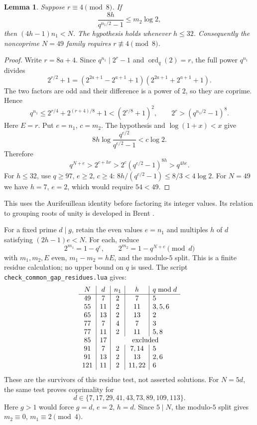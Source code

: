 \documentclass[11pt]{article}
\newtheorem{lemma}{Lemma}
\begin{document}
\begin{lemma}\label{lem:aurifeuillean-height}
Suppose $r\equiv4\pmod8$. If
\[
\frac{8h}{q^{n_1/2}-1}\le m_2\log2,
\]
then $(4h-1)n_1<N$. The hypothesis holds whenever $h\le32$.
Consequently the noncoprime $N=49$ family requires
$r\not\equiv4\pmod8$.
\end{lemma}
\begin{proof}
Write $r=8a+4$. Since $q^{n_1}\mid2^r-1$ and
$\operatorname{ord}_q(2)=r$, the full power $q^{n_1}$ divides
\[
2^{r/2}+1
=(2^{2a+1}-2^{a+1}+1)(2^{2a+1}+2^{a+1}+1).
\]
The two factors are odd and their difference is a power of $2$,
so they are coprime. Hence
\[
q^{n_1}\le2^{r/4}+2^{(r+4)/8}+1
 <(2^{r/8}+1)^2,
\qquad 2^r>(q^{n_1/2}-1)^8.
\]
Here $E=r$. Put $e=n_1$, $c=m_2$. The hypothesis and
$\log(1+x)<x$ give
\[
8h\log\frac{q^{e/2}}{q^{e/2}-1}<c\log2.
\]
Therefore
\[
q^{N+e}>2^{c+hr}
 >2^c(q^{e/2}-1)^{8h}>q^{4he}.
\]
For $h\le32$, use $q\ge97$, $e\ge2$, $c\ge4$:
$8h/(q^{e/2}-1)\le8/3<4\log2$.
For $N=49$ we have $h=7$, $e=2$, which would require $54<49$.
\end{proof}
This uses the Aurifeuillean identity before factoring its integer
values. Its relation to grouping roots of unity is developed in
Brent \cite[\S\S2--3]{Brent}.

For a fixed prime $d\mid g$, retain the even values $e=n_1$ and
multiples $h$ of $d$ satisfying $(2h-1)e<N$.
For each, reduce
\[
2^{m_1}=1-q^e,\qquad 2^{m_2}=1-q^{N+e}\pmod d
\]
with $m_1,m_2,E$ even, $m_1-m_2=hE$, and the modulo-$5$ split.
This is a finite residue calculation; no upper bound on $q$ is used.
The script \texttt{check\_common\_gap\_residues.lua} gives:
\[
\begin{array}{c|c|c|c|l}
N&d&n_1&h&q\bmod d\\\hline
49&7&2&7&5\\
55&11&2&11&3,5,6\\
65&13&2&13&2\\
77&7&4&7&3\\
77&11&2&11&5,8\\
85&17&\multicolumn{3}{c}{\text{excluded}}\\
91&7&2&7,14&5\\
91&13&2&13&2,6\\
121&11&2&11,22&6
\end{array}
\]
These are the survivors of this residue test, not asserted solutions.
For $N=5d$, the same test proves coprimality for
\[
d\in\{7,17,29,41,43,73,89,109,113\}.
\]
Here $g>1$ would force $g=d$, $e=2$, $h=d$.
Since $5\mid N$, the modulo-$5$ split gives
$m_2\equiv0$, $m_1\equiv2\pmod4$.
\end{document}

